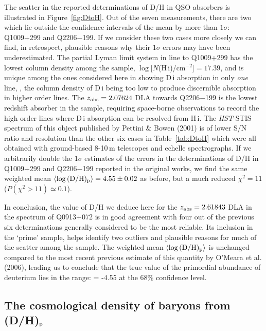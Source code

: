 \documentclass[useAMS,usenatbib]{mn2e}
\begin{document}
The scatter in the reported determinations of D/H in
QSO absorbers is illustrated in Figure~\ref{fig:DtoH}.
Out of the seven measurements, there are two which lie
outside the confidence intervals of the mean
by more than $1 \sigma$: Q1009+299 and Q2206$-$199.
If we consider these two cases more closely we can find,
in retrospect, plausible reasons why their $1 \sigma$ errors
may have been underestimated.
The partial Lyman limit system in line to Q1009+299 has the lowest column
density among the sample, $\log [N$(H\,{\sc i})/cm$^{-2}] = 17.39$,
and is unique among the ones considered here in showing
D\,{\sc i} absorption in only \emph{one} line, \lya,
the column density of D\,{\sc i} being too low
to produce discernible absorption in
higher order lines.
The $z_{\rm abs} = 2.07624$ DLA towards Q2206$-$199
is the lowest redshift absorber in the sample, requiring
space-borne observations to record the high order
lines where D\,{\sc i} absorption can be resolved from
H\,{\sc i}. The \textit{HST}-STIS spectrum of this object
published by Pettini \& Bowen (2001) is of lower S/N
ratio and resolution than the other six cases in Table~\ref{tab:DtoH}
which were all obtained with ground-based 8-10\,m telescopes
and echelle spectrographs.
If we arbitrarily double the $1 \sigma$ estimates of the errors
in the determinations of D/H in  Q1009+299 and Q2206$-$199
reported in the original works, we find the same weighted mean
$\langle \log {\rm (D/H)_p}\rangle = 4.55 \pm 0.02$ as before,
but a much reduced
$\chi^2 = 11$ ($P(\chi^2 > 11) \simeq  0.1$).


In conclusion, the value of D/H we deduce here for the
$z_{\rm abs} = 2.61843$ DLA in the spectrum of
Q0913+072 is in good agreement with four out of the
previous six determinations generally considered to be
the most reliable. Its inclusion in the `prime' sample,
helps identify two outliers and plausible reasons
for much of the scatter among the sample. The weighted mean
$\langle \log {\rm (D/H)_p}\rangle$ is unchanged
compared to the most recent previous estimate of this
quantity by O'Meara et al. (2006), leading us to
conclude that the true value of the primordial
abundance of deuterium lies in the range:
\bneq
\langle {} \rangle = -4.55 
\label{eq:mean_dtoh}
\eneq
at the 68\% confidence level.

\subsection{The cosmological density of baryons from (D/H)$_{\rm p}$}
\end{document}
